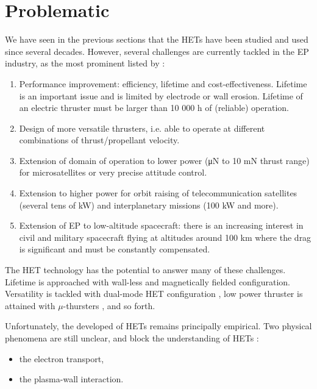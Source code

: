 
\section*{Problematic}
\label{sec-problematic}

We have seen in the previous sections that the \ac{HET}s have been studied and used since several decades.
However, several challenges are currently tackled in the \ac{EP} industry, as the most prominent listed by \citet{samukawa2012} :
\begin{enumerate}
  \item Performance improvement: efficiency, lifetime and cost-effectiveness.
   Lifetime is an important issue and is limited by electrode or wall erosion.
   Lifetime of an electric thruster must be larger than 10 000 h of (reliable) operation.
   \item  Design of more versatile thrusters, i.e. able to operate at different combinations of thrust/propellant velocity.
   \item  Extension of domain of operation to lower power (μN to 10 mN thrust range) for microsatellites or very precise attitude control.
   \item  Extension to higher power for orbit raising of telecommunication satellites (several tens of kW) and    interplanetary missions (100 kW and more).
   \item Extension of EP to low-altitude spacecraft: there is an increasing interest in civil and military spacecraft flying  at altitudes around 100 km where the drag is significant and must be constantly compensated.
\end{enumerate}

The \ac{HET} technology has the potential to answer many of these challenges.
Lifetime is approached with wall-less and magnetically fielded configuration.
Versatility is tackled with dual-mode \ac{HET} configuration \citep{boniface2017}, low power thruster is attained with $\mu$-thursters \citep{lascombes2018}, and so forth.

Unfortunately, the developed of \ac{HET}s remains principally empirical. 
Two physical phenomena are still unclear, and block the understanding of \ac{HET}s \citep{samukawa2012,adamovich2017}:
\begin{itemize}
  \item the electron transport,
  \item the plasma-wall interaction.
\end{itemize}

